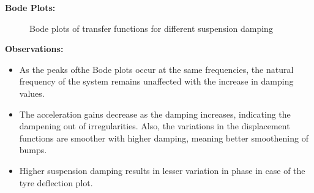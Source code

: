 \documentclass[12pt, a4paper, oneside]{report}
\begin{document}
    \textbf{Bode Plots:}
    \begin{figure}[H]
        \centering
        \hfill
        \hfill
        \par
        \caption{Bode plots of transfer functions for different suspension damping}
        \label{fig: open_loop_bode}
    \end{figure}

    \textbf{Observations:}
    \begin{itemize}
        \item As the peaks ofthe Bode plots occur at the same frequencies, the natural frequency of the system remains unaffected with the increase in damping values.
        \item The acceleration gains decrease as the damping increases, indicating the dampening out of irregularities. Also, the variations in the displacement functions are smoother with higher damping, meaning better smoothening of bumps.
        \item Higher suspension damping results in lesser variation in phase in case of the tyre deflection plot.
    \end{itemize}
\end{document}
